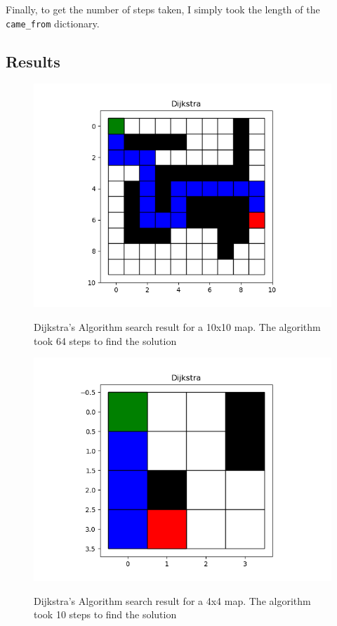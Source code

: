 \documentclass[journal]{IEEEtran}
\begin{document}
    Finally, to get the number of steps taken, I simply took the length of the \lstinline{came_from} dictionary.
    \subsection{Results}

    \begin{figure}[ht]
        \includegraphics[width=\linewidth]{figures/Dijkstra_LargeMap_Path.png}
        \label{fig:Dijkstra_Weights_Example}
        \caption{Dijkstra's Algorithm search result for a 10x10 map. The algorithm took 64 steps to find the solution}
    \end{figure} 

    \begin{figure}[ht]
        \includegraphics[width=\linewidth]{figures/Dijkstra_SmallMap_Path.png}
        \label{fig:Dijkstra_Weights_Example}
        \caption{Dijkstra's Algorithm search result for a 4x4 map. The algorithm took 10 steps to find the solution}
    \end{figure} 
\end{document}
